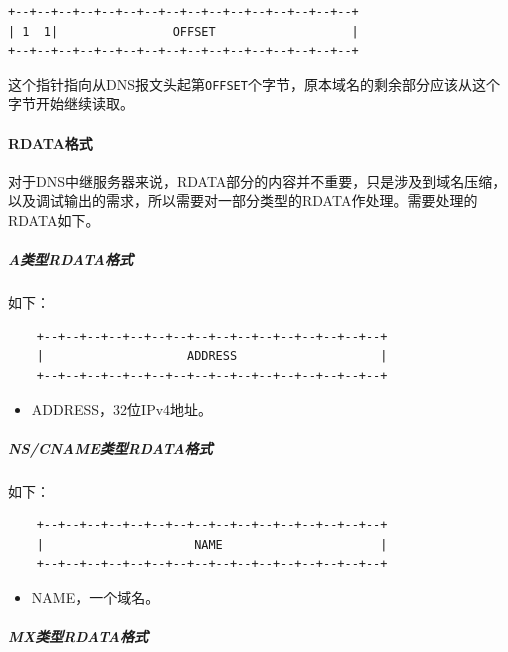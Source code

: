 \documentclass[lang=cn,11pt,a4paper,cite=authornum]{paper}
\begin{document}
\begin{code}
\begin{verbatim}
+--+--+--+--+--+--+--+--+--+--+--+--+--+--+--+--+
| 1  1|                OFFSET                   |
+--+--+--+--+--+--+--+--+--+--+--+--+--+--+--+--+
\end{verbatim}
\end{code}

这个指针指向从DNS报文头起第\texttt{OFFSET}个字节，原本域名的剩余部分应该从这个字节开始继续读取。

\paragraph{RDATA格式}

对于DNS中继服务器来说，RDATA部分的内容并不重要，只是涉及到域名压缩，以及调试输出的需求，所以需要对一部分类型的RDATA作处理。需要处理的RDATA如下。

\subparagraph{A类型RDATA格式}

如下：

\begin{code}
\begin{verbatim}
    +--+--+--+--+--+--+--+--+--+--+--+--+--+--+--+--+
    |                    ADDRESS                    |
    +--+--+--+--+--+--+--+--+--+--+--+--+--+--+--+--+
\end{verbatim}
\end{code}

\begin{itemize}
    \item ADDRESS，32位IPv4地址。
\end{itemize}

\subparagraph{NS/CNAME类型RDATA格式}

如下：

\begin{code}
\begin{verbatim}
    +--+--+--+--+--+--+--+--+--+--+--+--+--+--+--+--+
    |                     NAME                      |
    +--+--+--+--+--+--+--+--+--+--+--+--+--+--+--+--+
\end{verbatim}
\end{code}

\begin{itemize}
    \item NAME，一个域名。
\end{itemize}

\subparagraph{MX类型RDATA格式}
\end{document}

